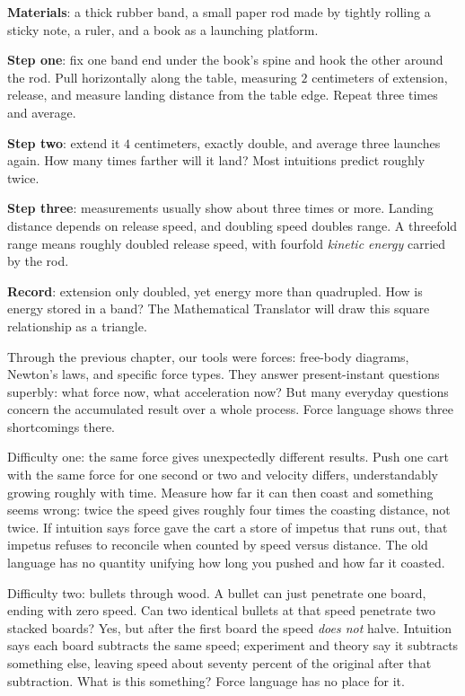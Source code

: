 \begin{experiment}
\textbf{Materials}: a thick rubber band, a small paper rod made by tightly rolling a sticky note, a ruler, and a book as a launching platform.

\textbf{Step one}: fix one band end under the book's spine and hook the other around the rod. Pull horizontally along the table, measuring \(2\) centimeters of extension, release, and measure landing distance from the table edge. Repeat three times and average.

\textbf{Step two}: extend it \(4\) centimeters, exactly double, and average three launches again. How many times farther will it land? Most intuitions predict roughly twice.

\textbf{Step three}: measurements usually show about three times or more. Landing distance depends on release speed, and doubling speed doubles range. A threefold range means roughly doubled release speed, with fourfold \emph{kinetic energy} carried by the rod.

\textbf{Record}: extension only doubled, yet energy more than quadrupled. How is energy stored in a band? The Mathematical Translator will draw this square relationship as a triangle.
\end{experiment}


Through the previous chapter, our tools were forces: free-body diagrams, Newton's laws, and specific force types. They answer present-instant questions superbly: what force now, what acceleration now? But many everyday questions concern the accumulated result over a whole process. Force language shows three shortcomings there.

Difficulty one: the same force gives unexpectedly different results. Push one cart with the same force for one second or two and velocity differs, understandably growing roughly with time. Measure how far it can then coast and something seems wrong: twice the speed gives roughly four times the coasting distance, not twice. If intuition says force gave the cart a store of impetus that runs out, that impetus refuses to reconcile when counted by speed versus distance. The old language has no quantity unifying how long you pushed and how far it coasted.

Difficulty two: bullets through wood. A bullet can just penetrate one board, ending with zero speed. Can two identical bullets at that speed penetrate two stacked boards? Yes, but after the first board the speed \emph{does not} halve. Intuition says each board subtracts the same speed; experiment and theory say it subtracts something else, leaving speed about seventy percent of the original after that subtraction. What is this something? Force language has no place for it.

